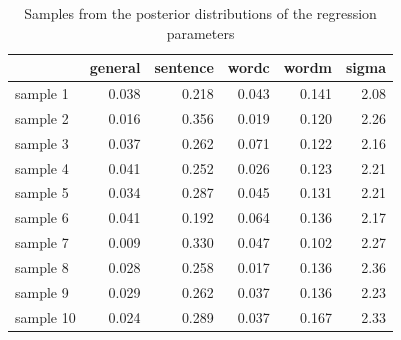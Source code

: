 \documentclass[11pt,a4paper,twoside]{book}\usepackage[]{graphicx}\usepackage[]{color}
\newenvironment{knitrout}{}{} %
\begin{document}
\begin{knitrout}
\color{fgcolor}\begin{table}

\caption{\label{tab:empirical.data.postsample2}Samples from the posterior distributions of the regression parameters}
\centering
\begin{tabular}[t]{lrrrrr}
\toprule
  & general & sentence & wordc & wordm & sigma\\
\midrule
sample 1 & 0.038 & 0.218 & 0.043 & 0.141 & 2.08\\
sample 2 & 0.016 & 0.356 & 0.019 & 0.120 & 2.26\\
sample 3 & 0.037 & 0.262 & 0.071 & 0.122 & 2.16\\
sample 4 & 0.041 & 0.252 & 0.026 & 0.123 & 2.21\\
sample 5 & 0.034 & 0.287 & 0.045 & 0.131 & 2.21\\
sample 6 & 0.041 & 0.192 & 0.064 & 0.136 & 2.17\\
sample 7 & 0.009 & 0.330 & 0.047 & 0.102 & 2.27\\
sample 8 & 0.028 & 0.258 & 0.017 & 0.136 & 2.36\\
sample 9 & 0.029 & 0.262 & 0.037 & 0.136 & 2.23\\
sample 10 & 0.024 & 0.289 & 0.037 & 0.167 & 2.33\\
\bottomrule
\end{tabular}
\end{table}


\end{knitrout}
\end{document}
